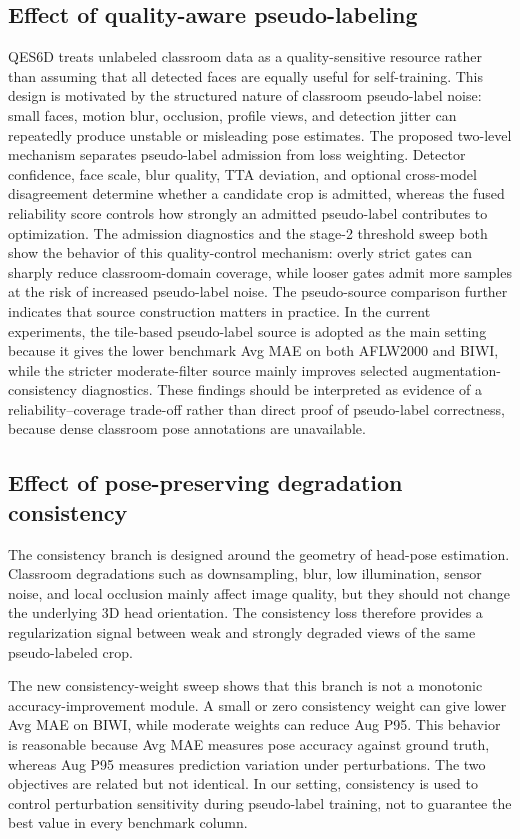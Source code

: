 \documentclass[preprint,12pt]{elsarticle}
\begin{document}
\subsection{Effect of quality-aware pseudo-labeling}
QES6D treats unlabeled classroom data as a quality-sensitive resource rather than assuming that all detected faces are equally useful for self-training. This design is motivated by the structured nature of classroom pseudo-label noise: small faces, motion blur, occlusion, profile views, and detection jitter can repeatedly produce unstable or misleading pose estimates. The proposed two-level mechanism separates pseudo-label admission from loss weighting. Detector confidence, face scale, blur quality, TTA deviation, and optional cross-model disagreement determine whether a candidate crop is admitted, whereas the fused reliability score controls how strongly an admitted pseudo-label contributes to optimization. The admission diagnostics and the stage-2 threshold sweep both show the behavior of this quality-control mechanism: overly strict gates can sharply reduce classroom-domain coverage, while looser gates admit more samples at the risk of increased pseudo-label noise. The pseudo-source comparison further indicates that source construction matters in practice. In the current experiments, the tile-based pseudo-label source is adopted as the main setting because it gives the lower benchmark Avg MAE on both AFLW2000 and BIWI, while the stricter moderate-filter source mainly improves selected augmentation-consistency diagnostics. These findings should be interpreted as evidence of a reliability--coverage trade-off rather than direct proof of pseudo-label correctness, because dense classroom pose annotations are unavailable.

\subsection{Effect of pose-preserving degradation consistency}
The consistency branch is designed around the geometry of head-pose estimation. Classroom degradations such as downsampling, blur, low illumination, sensor noise, and local occlusion mainly affect image quality, but they should not change the underlying 3D head orientation. The consistency loss therefore provides a regularization signal between weak and strongly degraded views of the same pseudo-labeled crop.

The new consistency-weight sweep shows that this branch is not a monotonic accuracy-improvement module. A small or zero consistency weight can give lower Avg MAE on BIWI, while moderate weights can reduce Aug P95. This behavior is reasonable because Avg MAE measures pose accuracy against ground truth, whereas Aug P95 measures prediction variation under perturbations. The two objectives are related but not identical. In our setting, consistency is used to control perturbation sensitivity during pseudo-label training, not to guarantee the best value in every benchmark column.
\end{document}
